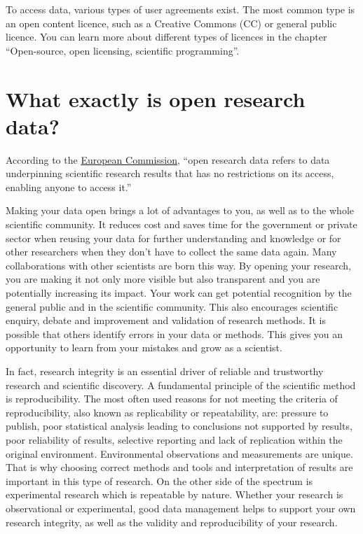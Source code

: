 \documentclass[
]{book}
\begin{document}
To access data, various types of user agreements exist. The most common type is an open content licence, such as a Creative Commons (CC) or general public licence. You can learn more about different types of licences in the chapter ``Open-source, open licensing, scientific programming''.

\hypertarget{what-exactly-is-open-research-data}{%
\section{What exactly is open research data?}\label{what-exactly-is-open-research-data}}

According to the \href{https://ec.europa.eu/info/research-and-innovation/strategy/strategy-2020-2024/our-digital-future/open-science/open-science-monitor/facts-and-figures-open-research-data_en}{European Commission}, ``open research data refers to data underpinning scientific research results that has no restrictions on its access, enabling anyone to access it.''

Making your data open brings a lot of advantages to you, as well as to the whole scientific community. It reduces cost and saves time for the government or private sector when reusing your data for further understanding and knowledge or for other researchers when they don't have to collect the same data again. Many collaborations with other scientists are born this way. By opening your research, you are making it not only more visible but also transparent and you are potentially increasing its impact. Your work can get potential recognition by the general public and in the scientific community. This also encourages scientific enquiry, debate and improvement and validation of research methods. It is possible that others identify errors in your data or methods. This gives you an opportunity to learn from your mistakes and grow as a scientist.

In fact, research integrity is an essential driver of reliable and trustworthy research and scientific discovery. A fundamental principle of the scientific method is reproducibility. The most often used reasons for not meeting the criteria of reproducibility, also known as replicability or repeatability, are: pressure to publish, poor statistical analysis leading to conclusions not supported by results, poor reliability of results, selective reporting and lack of replication within the original environment. Environmental observations and measurements are unique. That is why choosing correct methods and tools and interpretation of results are important in this type of research. On the other side of the spectrum is experimental research which is repeatable by nature. Whether your research is observational or experimental, good data management helps to support your own research integrity, as well as the validity and reproducibility of your research.
\end{document}
